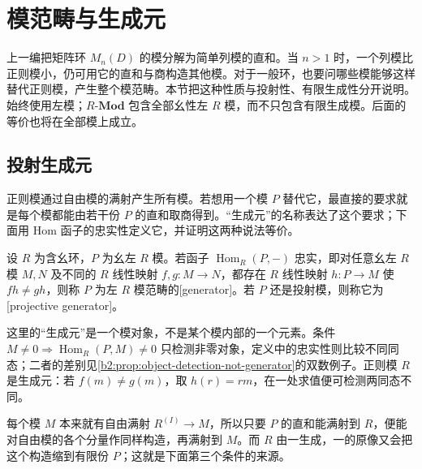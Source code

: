 
\section{模范畴与生成元}
\label{b2:sec:1601}

上一编把矩阵环 \(M_n(D)\) 的模分解为简单列模的直和。当 \(n>1\) 时，一个列模比正则模小，仍可用它的直和与商构造其他模。对于一般环，也要问哪些模能够这样替代正则模，产生整个模范畴。本节把这种性质与投射性、有限生成性分开说明。始终使用左模；\(R\text{-}\mathbf{Mod}\) 包含全部幺性左 \(R\) 模，而不只包含有限生成模。后面的等价也将在全部模上成立。

%
%

\subsection{投射生成元}
\label{b2:subsec:1601:01}

正则模通过自由模的满射产生所有模。若想用一个模 \(P\) 替代它，最直接的要求就是每个模都能由若干份 \(P\) 的直和取商得到。“生成元”的名称表达了这个要求；下面用 Hom 函子的忠实性定义它，并证明这两种说法等价。

\begin{definition}\label{b2:def:module-generator}
	设 \(R\) 为含幺环，\(P\) 为幺左 \(R\) 模。若函子 \(\operatorname{Hom}_R(P,-)\) 忠实，即对任意幺左 \(R\) 模 \(M,N\) 及不同的 \(R\) 线性映射 \(f,g:M\rightarrow N\)，都存在 \(R\) 线性映射 \(h:P\rightarrow M\) 使 \(fh\ne gh\)，则称 \(P\) 为左 \(R\) 模范畴的[generator]。若 \(P\) 还是投射模，则称它为[projective generator]。
\end{definition}

这里的“生成元”是一个模对象，不是某个模内部的一个元素。条件 \(M\ne0\Rightarrow\operatorname{Hom}_R(P,M)\ne0\) 只检测非零对象，定义中的忠实性则比较不同同态；二者的差别见\cref{b2:prop:object-detection-not-generator}的双数例子。正则模 \(R\) 是生成元：若 \(f(m)\ne g(m)\)，取 \(h(r)=rm\)，在一处求值便可检测两同态不同。

\ProseParagraphBreak
每个模 \(M\) 本来就有自由满射 \(R^{(I)}\to M\)，所以只要 \(P\) 的直和能满射到 \(R\)，便能对自由模的各个分量作同样构造，再满射到 \(M\)。而 \(R\) 由一生成，一的原像又会把这个构造缩到有限份 \(P\)；这就是下面第三个条件的来源。

